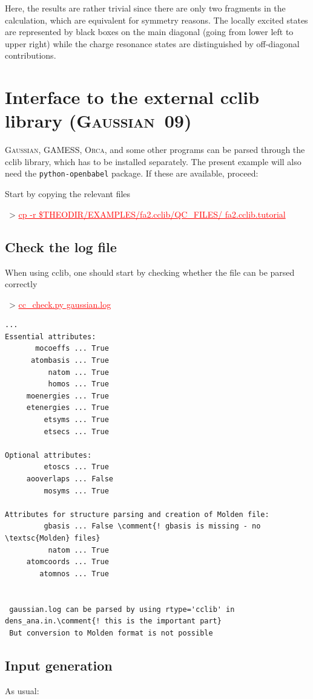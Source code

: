 \documentclass[DIV=12,headings=normal]{scrartcl}
\newcommand{\comment}[1]{\textcolor{blue}{#1}}
\newcommand{\redl}[1]{{\textcolor{red}{\underline{#1}}}}
\newcommand{\comm}[1]{
\small
~> \redl{#1}
\normalsize
}
\begin{document}
Here, the results are rather trivial since there are only two fragments in the calculation, which are equivalent for symmetry reasons.
The locally excited states are represented by black boxes on the main diagonal (going from lower left to upper right) while the charge resonance states are distinguished by off-diagonal contributions.

\section{Interface to the external cclib library (\textsc{Gaussian~09})}
\textsc{Gaussian}, GAMESS, \textsc{Orca}, and some other programs can be parsed through the cclib library, which has to be installed separately.
The present example will also need the \texttt{python-openbabel} package.
If these are available, proceed:

Start by copying the relevant files

\comm{cp -r \$THEODIR/EXAMPLES/fa2.cclib/QC\_FILES/ fa2.cclib.tutorial}

\subsection{Check the log file}
When using cclib, one should start by checking whether the file can be parsed correctly

\comm{cc\_check.py gaussian.log}

\scriptsize
\begin{Verbatim}[commandchars=\\\{\}]
...
Essential attributes:
       mocoeffs ... True
      atombasis ... True
          natom ... True
          homos ... True
     moenergies ... True
     etenergies ... True
         etsyms ... True
         etsecs ... True

Optional attributes:
         etoscs ... True
     aooverlaps ... False
         mosyms ... True

Attributes for structure parsing and creation of Molden file:
         gbasis ... False \comment{! gbasis is missing - no \textsc{Molden} files}
          natom ... True
     atomcoords ... True
        atomnos ... True


 gaussian.log can be parsed by using rtype='cclib' in dens_ana.in.\comment{! this is the important part}
 But conversion to Molden format is not possible
\end{Verbatim}
\normalsize

\subsection{Input generation}
As usual:
\end{document}

